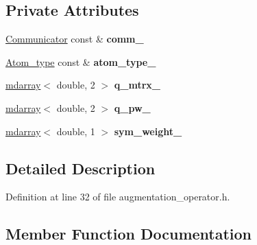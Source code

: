 \subsection*{Private Attributes}
\begin{DoxyCompactItemize}
\item 
\hypertarget{classsirius_1_1_augmentation__operator_a8843838b1bbeee6f260267829d7ed8f1}{}\hyperlink{classsddk_1_1_communicator}{Communicator} const \& {\bfseries comm\+\_\+}\label{classsirius_1_1_augmentation__operator_a8843838b1bbeee6f260267829d7ed8f1}

\item 
\hypertarget{classsirius_1_1_augmentation__operator_ae2187c12ffe7b56bccfac80eb1b57b5f}{}\hyperlink{classsirius_1_1_atom__type}{Atom\+\_\+type} const \& {\bfseries atom\+\_\+type\+\_\+}\label{classsirius_1_1_augmentation__operator_ae2187c12ffe7b56bccfac80eb1b57b5f}

\item 
\hypertarget{classsirius_1_1_augmentation__operator_a19983d1b92bfbfd550042d057c4f983a}{}\hyperlink{classsddk_1_1mdarray}{mdarray}$<$ double, 2 $>$ {\bfseries q\+\_\+mtrx\+\_\+}\label{classsirius_1_1_augmentation__operator_a19983d1b92bfbfd550042d057c4f983a}

\item 
\hypertarget{classsirius_1_1_augmentation__operator_a72a51e71c31bf1934fb936e45262a7c7}{}\hyperlink{classsddk_1_1mdarray}{mdarray}$<$ double, 2 $>$ {\bfseries q\+\_\+pw\+\_\+}\label{classsirius_1_1_augmentation__operator_a72a51e71c31bf1934fb936e45262a7c7}

\item 
\hypertarget{classsirius_1_1_augmentation__operator_abb5b3a04da6ebb5f5c47b6401d2378fa}{}\hyperlink{classsddk_1_1mdarray}{mdarray}$<$ double, 1 $>$ {\bfseries sym\+\_\+weight\+\_\+}\label{classsirius_1_1_augmentation__operator_abb5b3a04da6ebb5f5c47b6401d2378fa}

\end{DoxyCompactItemize}


\subsection{Detailed Description}


Definition at line 32 of file augmentation\+\_\+operator.\+h.



\subsection{Member Function Documentation}
\hypertarget{classsirius_1_1_augmentation__operator_ae3648dda8a0fc0089279e91abfb32c1e}{}
